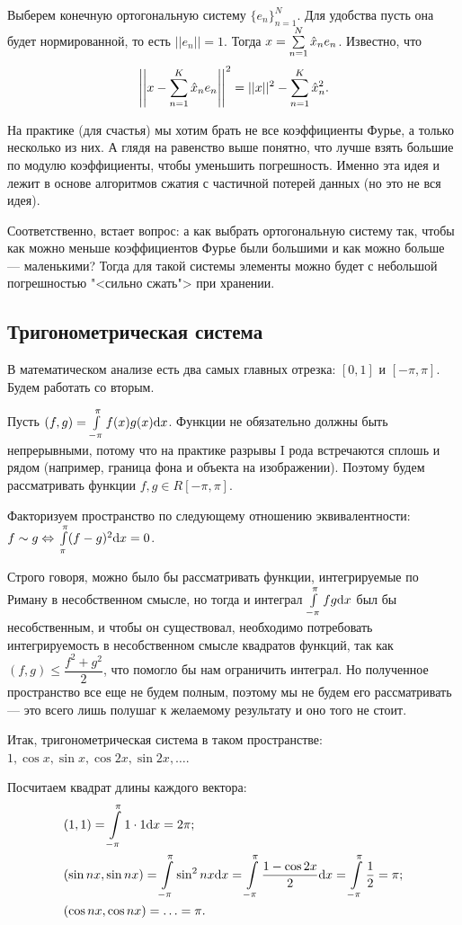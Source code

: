 Выберем конечную ортогональную систему $\{e_n\}_{n=1}^N$. Для удобства пусть она будет нормированной, то есть $||e_n|| = 1$. Тогда $x = \sum\limits_{n = 1}^{N} \hat{x}_ne_n$. Известно, что 
$$\left|\left|x - \sum\limits_{n=1}^{K}\hat{x}_ne_n\right|\right|^2 = ||x||^2 - \sum\limits_{n=1}^{K}\hat{x}_n^2.$$

На практике (для счастья) мы хотим брать не все коэффициенты Фурье, а только несколько из них. А глядя на равенство выше понятно, что лучше взять большие по модулю коэффициенты, чтобы уменьшить погрешность. Именно эта идея и лежит в основе алгоритмов сжатия с частичной потерей данных (но это не вся идея).

Соответственно, встает вопрос: а как выбрать ортогональную систему так, чтобы как можно меньше коэффициентов Фурье были большими и как можно больше --- маленькими? Тогда для такой системы элементы можно будет с небольшой погрешностью "<сильно сжать"> при хранении.

\subsection{Тригонометрическая система}
В математическом анализе есть два самых главных отрезка: $[0, 1]$ и $[-\pi, \pi]$. Будем работать со вторым.

Пусть $(f, g) = \int\limits_{-\pi}^{\pi} f(x)g(x) \mathrm{d} x$. Функции не обязательно должны быть непрерывными, потому что на практике разрывы I рода встречаются сплошь и рядом (например, граница фона и объекта на изображении). Поэтому будем рассматривать функции $f, g \in R[-\pi, \pi]$.

Факторизуем пространство по следующему отношению эквивалентности: $f \sim g \Leftrightarrow \\ \int\limits_{\pi}^{\pi}(f - g)^2 \mathrm{d} x = 0$. 

Строго говоря, можно было бы рассматривать функции, интегрируемые по Риману в несобственном смысле, но тогда и интеграл $\int\limits_{-\pi}^{\pi}fg \mathrm{d} x$ был бы несобственным, и чтобы он существовал, необходимо потребовать интегрируемость в несобственном смысле квадратов функций, так как $(f, g) \leq \dfrac{f^2 + g^2}{2}$, что помогло бы нам ограничить интеграл. Но полученное пространство все еще не будем полным, поэтому мы не будем его рассматривать --- это всего лишь полушаг к желаемому результату и оно того не стоит.

Итак, тригонометрическая система в таком пространстве: $1, \cos x, \sin x, \cos 2x, \sin 2x, \ldots$.

Посчитаем квадрат длины каждого вектора:
\begin{align*}
&(1, 1) =  \int\limits_{-\pi}^{\pi} 1 \cdot 1 \mathrm{d} x = 2\pi;\\
&(\sin nx, \sin nx) =  \int\limits_{-\pi}^{\pi} \sin^2 nx \mathrm{d} x =  \int\limits_{-\pi}^{\pi} \frac{1 - \cos 2x}{2} \mathrm{d} x =  \int\limits_{-\pi}^{\pi} \dfrac{1}{2} = \pi;\\
&(\cos nx, \cos nx) = \ldots = \pi.
\end{align*}

